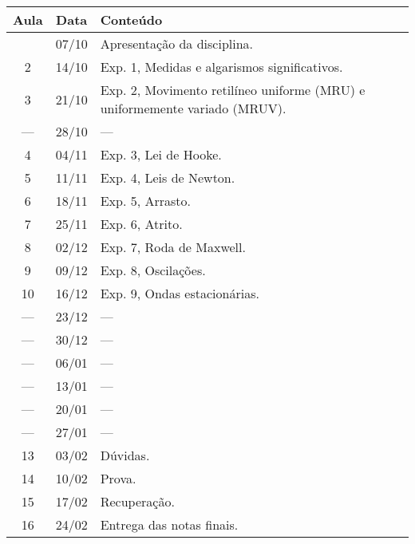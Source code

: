 \begin{center}
\begin{longtable}{ccp{70mm}}
\toprule
Aula & Data & Conteúdo \\
\midrule
\endhead
\bottomrule
\endfoot
  1 & 07/10 & Apresentação da disciplina. \\
  2 & 14/10 & Exp. 1, Medidas e algarismos significativos. \\
  3 & 21/10 & Exp. 2, Movimento retilíneo uniforme (MRU) e uniformemente variado (MRUV). \\
--- & 28/10 & --- \\
  4 & 04/11 & Exp. 3, Lei de Hooke. \\
  5 & 11/11 & Exp. 4, Leis de Newton. \\
  6 & 18/11 & Exp. 5, Arrasto. \\
  7 & 25/11 & Exp. 6, Atrito. \\
  8 & 02/12 & Exp. 7, Roda de Maxwell. \\
  9 & 09/12 & Exp. 8, Oscilações. \\
 10 & 16/12 & Exp. 9, Ondas estacionárias. \\
--- & 23/12 & --- \\
--- & 30/12 & --- \\
--- & 06/01 & --- \\
--- & 13/01 & --- \\
--- & 20/01 & --- \\ 
--- & 27/01 & --- \\
 13 & 03/02 & Dúvidas. \\
 14 & 10/02 & Prova.\\
 15 & 17/02 & Recuperação.\\
 16 & 24/02 & Entrega das notas finais.
\end{longtable}
\end{center}


\cleardoublepage
